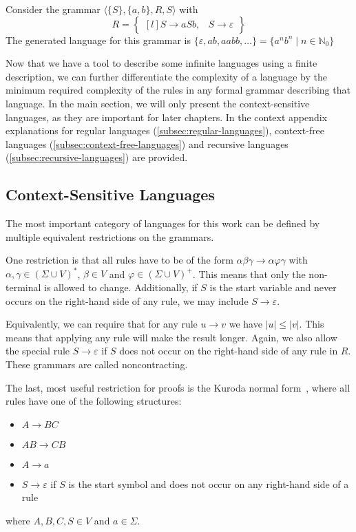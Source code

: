 \begin{exmp}
    Consider the grammar $\langle \{S\}, \{a, b\}, R, S \rangle$ with
    \[
        R = \begin{Bmatrix*}[l]
                S \to aSb,
                &S \to \varepsilon
        \end{Bmatrix*}
    \]
    The generated language for this grammar is $\{\varepsilon, ab, aabb, \dots\} = \{a^{n}b^{n} \mid n \in \mathbb{N}_0\}$
\end{exmp}

Now that we have a tool to describe some infinite languages using a finite description, we can further differentiate the complexity of a language by the minimum required complexity of the rules in any formal grammar describing that language.
In the main section, we will only present the context-sensitive languages, as they are important for later chapters.
In the context appendix explanations for regular languages (\cref{subsec:regular-languages}), context-free languages (\cref{subsec:context-free-languages}) and recursive languages (\cref{subsec:recursive-languages}) are provided.

\subsection{Context-Sensitive Languages}\label{subsec:context-sensitive-languages}

The most important category of languages for this work can be defined by multiple equivalent restrictions on the grammars.

One restriction is that all rules have to be of the form $\alpha\beta\gamma \to \alpha\varphi\gamma$ with $\alpha, \gamma \in (\Sigma \cup V)^{*}$, $\beta \in V$ and $\varphi \in (\Sigma \cup V)^{+}$.
This means that only the non-terminal is allowed to change.
Additionally, if $S$ is the start variable and never occurs on the right-hand side of any rule, we may include $S \to \varepsilon$.

Equivalently, we can require that for any rule $u \to v$ we have $|u| \leq |v|$.
This means that applying any rule will make the result longer.
Again, we also allow the special rule $S \to \varepsilon$ if $S$ does not occur on the right-hand side of any rule in $R$.
These grammars are called noncontracting.

The last, most useful restriction for proofs is the Kuroda normal form~\cite{Pettorossi2022}, where all rules have one of the following structures:
\begin{itemize}
    \setlength\itemsep{0.2em}
    \item $A \to BC$
    \item $AB \to CB$
    \item $A \to a$
    \item $S \to \varepsilon$ if $S$ is the start symbol and does not occur on any right-hand side of a rule
\end{itemize}
where $A, B, C, S \in V$ and $a \in \Sigma$.

